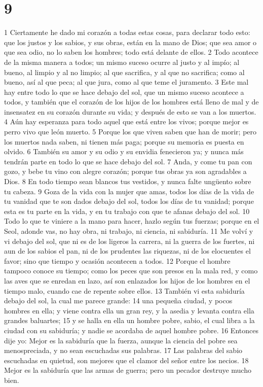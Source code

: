 \chapter{9}

1 Ciertamente he dado mi corazón a todas estas cosas, para declarar todo esto: que los justos y los sabios, y sus obras, están en la mano de Dios; que sea amor o que sea odio, no lo saben los hombres; todo está delante de ellos.
2 Todo acontece de la misma manera a todos; un mismo suceso ocurre al justo y al impío; al bueno, al limpio y al no limpio; al que sacrifica, y al que no sacrifica; como al bueno, así al que peca; al que jura, como al que teme el juramento.
3 Este mal hay entre todo lo que se hace debajo del sol, que un mismo suceso acontece a todos, y también que el corazón de los hijos de los hombres está lleno de mal y de insensatez en su corazón durante su vida; y después de esto se van a los muertos.
4 Aún hay esperanza para todo aquel que está entre los vivos; porque mejor es perro vivo que león muerto.
5 Porque los que viven saben que han de morir; pero los muertos nada saben, ni tienen más paga; porque su memoria es puesta en olvido.
6 También su amor y su odio y su envidia fenecieron ya; y nunca más tendrán parte en todo lo que se hace debajo del sol.
7 Anda, y come tu pan con gozo, y bebe tu vino con alegre corazón; porque tus obras ya son agradables a Dios.
8 En todo tiempo sean blancos tus vestidos, y nunca falte ungüento sobre tu cabeza.
9 Goza de la vida con la mujer que amas, todos los días de la vida de tu vanidad que te son dados debajo del sol, todos los días de tu vanidad; porque esta es tu parte en la vida, y en tu trabajo con que te afanas debajo del sol.
10 Todo lo que te viniere a la mano para hacer, hazlo según tus fuerzas; porque en el Seol, adonde vas, no hay obra, ni trabajo, ni ciencia, ni sabiduría.
11 Me volví y vi debajo del sol, que ni es de los ligeros la carrera, ni la guerra de los fuertes, ni aun de los sabios el pan, ni de los prudentes las riquezas, ni de los elocuentes el favor; sino que tiempo y ocasión acontecen a todos.
12 Porque el hombre tampoco conoce su tiempo; como los peces que son presos en la mala red, y como las aves que se enredan en lazo, así son enlazados los hijos de los hombres en el tiempo malo, cuando cae de repente sobre ellos.
13 También vi esta sabiduría debajo del sol, la cual me parece grande:
14 una pequeña ciudad, y pocos hombres en ella; y viene contra ella un gran rey, y la asedia y levanta contra ella grandes baluartes;
15 y se halla en ella un hombre pobre, sabio, el cual libra a la ciudad con su sabiduría; y nadie se acordaba de aquel hombre pobre.
16 Entonces dije yo: Mejor es la sabiduría que la fuerza, aunque la ciencia del pobre sea menospreciada, y no sean escuchadas sus palabras.
17 Las palabras del sabio escuchadas en quietud, son mejores que el clamor del señor entre los necios.
18 Mejor es la sabiduría que las armas de guerra; pero un pecador destruye mucho bien.

